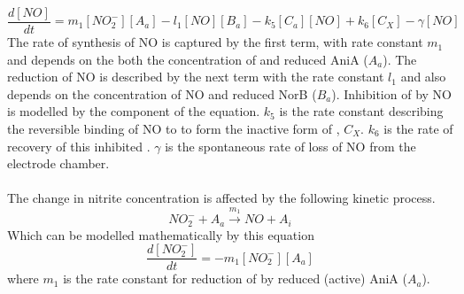 \begin{equation}
\frac{d[NO]}{dt} = m_{1}[NO_2^-][A_a] - l_1[NO][B_a] - k_5[C_a][NO] + k_6 [C_X] - \gamma[NO]
\label{eq:no}
\end{equation}
The rate of synthesis of NO is captured by the first term, with rate constant $m_{1}$ and depends on the both the concentration of \cNitrite{} and reduced AniA ($A_a$). The reduction of NO is described by the next term with the rate constant $l_1$ and also depends on the concentration of NO and reduced NorB ($B_a$). Inhibition of \cbbthree{} by NO is modelled by the  component of the equation. $k_5$ is the rate constant describing the reversible binding of NO to \cbbthree{} to form the inactive form of \cbbthree{}, $C_X$. $k_6$ is the rate of recovery of this inhibited \cbbthree{}. $\gamma$ is the spontaneous rate of loss of NO from the electrode chamber.\\
\clearpage
{}\\
The change in nitrite concentration is affected by the following kinetic process.
\begin{equation*}
NO_2^- + A_a \xrightarrow{m_1} NO + A_i
\end{equation*}
Which can be modelled mathematically by this equation
\begin{equation}
\frac{d[NO_2^-]}{dt} = - m_{1}[NO_2^-][A_a]
\label{eq:nitrite}
\end{equation}
where $m_{1}$ is the rate constant for reduction of \cNitrite{} by reduced (active) AniA ($A_a$).

